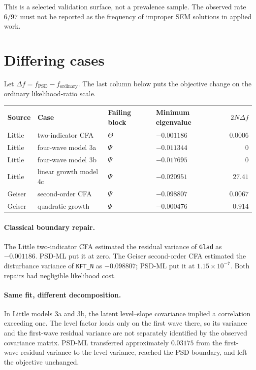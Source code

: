 \documentclass[11pt]{article}
\begin{document}
This is a selected validation surface, not a prevalence sample.  The observed
rate \(6/97\) must not be reported as the frequency of improper SEM solutions
in applied work.

\section*{Differing cases}

Let \(\Delta f=f_{\mathrm{PSD}}-f_{\mathrm{ordinary}}\).  The last column below
puts the objective change on the ordinary likelihood-ratio scale.

\begin{center}
\small
\begin{tabular}{llllr}
\toprule
Source & Case & Failing block & Minimum eigenvalue & \(2N\Delta f\) \\
\midrule
Little & two-indicator CFA       & \(\Theta\) & \(-0.001186\) & \(0.0006\) \\
Little & four-wave model 3a      & \(\Psi\)   & \(-0.011344\) & \(0\) \\
Little & four-wave model 3b      & \(\Psi\)   & \(-0.017695\) & \(0\) \\
Little & linear growth model 4c  & \(\Psi\)   & \(-0.020951\) & \(27.41\) \\
Geiser & second-order CFA        & \(\Psi\)   & \(-0.098807\) & \(0.0067\) \\
Geiser & quadratic growth        & \(\Psi\)   & \(-0.000476\) & \(0.914\) \\
\bottomrule
\end{tabular}
\end{center}

\paragraph{Classical boundary repair.}
The Little two-indicator CFA estimated the residual variance of
\texttt{Glad} as \(-0.001186\).  PSD-ML put it at zero.  The Geiser
second-order CFA estimated the disturbance variance of \texttt{KFT\_N} as
\(-0.098807\); PSD-ML put it at \(1.15\times 10^{-7}\).  Both repairs had
negligible likelihood cost.

\paragraph{Same fit, different decomposition.}
In Little models 3a and 3b, the latent level--slope covariance implied a
correlation exceeding one.  The level factor loads only on the first wave
there, so its variance and the first-wave residual variance are not separately
identified by the observed covariance matrix.  PSD-ML transferred
approximately \(0.03175\) from the first-wave residual variance to the level
variance, reached the PSD boundary, and left the objective unchanged.
\end{document}
